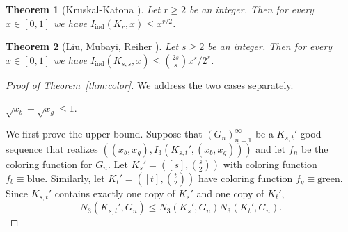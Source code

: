 \documentclass[11pt]{article}
\newtheorem{thm}{Theorem}[section]
\newcommand{\ind}{{\operatorname{ind}}}
\theoremstyle{definition}
\begin{document}
\begin{thm}[Kruskal-Katona \cite{13, 14}]\label{thm:KK}
    Let $r \ge 2$ be an integer. Then for every $x \in [0, 1]$ we have $I_\ind (K_r, x) \le x^{r/2}$. 
\end{thm}

\begin{thm}[Liu, Mubayi, Reiher \cite{LMR}]\label{thm:LMR}
    Let $s \ge 2$ be an integer. Then for every $x \in [0, 1]$ we have $I_\ind (K_{s,s}, x) \le \binom{2s}{s} x^s / 2^s$.
\end{thm}

\begin{proof}[Proof of Theorem~\ref{thm:color}]

    \noindent
    We address the two cases separately. 
    \medskip
        
       $\sqrt{x_b} + \sqrt{x_g} \le 1$.
    
    \noindent We first prove the upper bound.  Suppose that $(G_n)_{n = 1}^\infty$ be a $K_{s,t}'$-good sequence that realizes $( (x_b, x_g), I_3 (K_{s,t}', (x_b, x_g)) )$ and let $f_n$ be the coloring function for $G_n$. Let $K_s' = ([s], \binom{s}{2})$ with coloring function $f_b \equiv \text{blue}$. Similarly, let $K_t' = ([t], \binom{t}{2})$ have coloring function $f_g \equiv \text{green}$. Since $K_{s,t}'$ contains exactly one copy of $K_s'$ and one copy of $K_t'$,
    \begin{equation} \label{eqn:st}
        N_3 (K_{s,t}', G_n) \leq N_3 (K_{s}', G_n) N_3 (K_{t}', G_n).
    \end{equation}


\end{proof}
\end{document}
